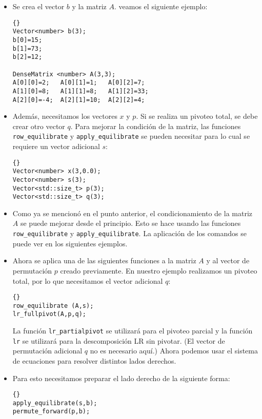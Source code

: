 \documentclass[a4paper,11pt]{article}
\theoremstyle{definition}
\begin{document}
\begin{itemize}
\item Se crea el vector $b$ y la matriz $A$. veamos el siguiente ejemplo:

  {\footnotesize{\begin{lstlisting}{}
Vector<number> b(3);
b[0]=15;
b[1]=73;
b[2]=12;

DenseMatrix <number> A(3,3);
A[0][0]=2;   A[0][1]=1;   A[0][2]=7;
A[1][0]=8;   A[1][1]=8;   A[1][2]=33;
A[2][0]=-4;  A[2][1]=10;  A[2][2]=4;
\end{lstlisting}}}

\item Además, necesitamos los vectores $x$ y $p$. Si se realiza un pivoteo total, 
se debe crear otro vector $q$. Para mejorar la condición de la matriz, 
las funciones \lstinline{row_equilibrate} y \lstinline{apply_equilibrate} se pueden necesitar
para lo cual se requiere un vector adicional $s$:

  {\footnotesize{\begin{lstlisting}{}
Vector<number> x(3,0.0);
Vector<number> s(3);
Vector<std::size_t> p(3);
Vector<std::size_t> q(3);
\end{lstlisting}}}

\item Como ya se mencionó en el punto anterior, el condicionamiento de la matriz $A$ 
  se puede mejorar desde el principio. Esto se hace usando las funciones \lstinline{row_equilibrate}
  y \lstinline{apply_equilibrate}. La aplicación de los comandos se puede ver en los siguientes ejemplos.

\item Ahora se aplica una de las siguientes funciones a la matriz $A$ y al vector de permutación 
$p$ creado previamente. En nuestro ejemplo realizamos un pivoteo total, por lo que 
necesitamos el vector adicional $q$:
  {\footnotesize{\begin{lstlisting}{}
row_equilibrate (A,s);
lr_fullpivot(A,p,q);
\end{lstlisting}}}
La función \lstinline{lr_partialpivot} se utilizará para el pivoteo parcial 
y la función \lstinline{lr} se utilizará para la descomposición LR sin pivotar.
(El vector de permutación adicional $q$ no es necesario aquí.) Ahora podemos 
usar el sistema de ecuaciones para resolver distintos lados derechos.

\item Para esto necesitamos preparar el lado derecho de la siguiente forma:

{\footnotesize{\begin{lstlisting}{}
apply_equilibrate(s,b);
permute_forward(p,b);
\end{lstlisting}}}


\end{itemize}
\end{document}
